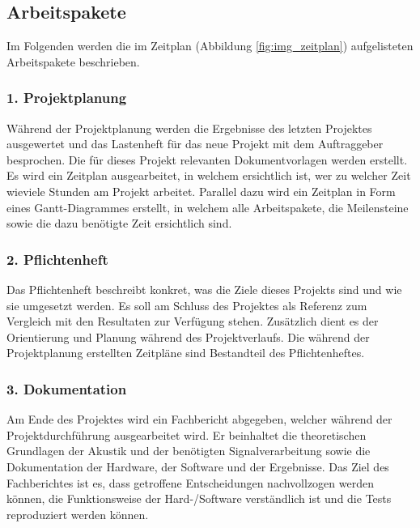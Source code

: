 \documentclass[10pt,a4paper,oneside]{99_fhnwreport}
\begin{document}
\subsection*{Arbeitspakete}\label{sec:arbeitspakete}
Im Folgenden werden die im Zeitplan (Abbildung \ref{fig:img_zeitplan}) aufgelisteten Arbeitspakete beschrieben.


\subsubsection*{1. Projektplanung}
Während der Projektplanung werden die Ergebnisse des letzten Projektes ausgewertet und das Lastenheft für das neue Projekt mit dem Auftraggeber besprochen. Die für dieses Projekt relevanten Dokumentvorlagen werden erstellt. Es wird ein Zeitplan ausgearbeitet, in welchem ersichtlich ist, wer zu welcher Zeit wieviele Stunden am Projekt arbeitet. Parallel dazu wird ein Zeitplan in Form eines Gantt-Diagrammes erstellt, in welchem alle Arbeitspakete, die Meilensteine sowie die dazu benötigte Zeit ersichtlich sind.


\subsubsection*{2. Pflichtenheft}
Das Pflichtenheft beschreibt konkret, was die Ziele dieses Projekts sind und wie sie umgesetzt werden. Es soll am Schluss des Projektes als Referenz zum Vergleich mit den Resultaten zur Verfügung stehen. Zusätzlich dient es der Orientierung und Planung während des Projektverlaufs. Die während der Projektplanung erstellten Zeitpläne sind Bestandteil des Pflichtenheftes.


\subsubsection*{3. Dokumentation}
Am Ende des Projektes wird ein Fachbericht abgegeben, welcher während der Projektdurchführung ausgearbeitet wird. Er beinhaltet die theoretischen Grundlagen der Akustik und der benötigten Signalverarbeitung sowie die Dokumentation der Hardware, der Software und der Ergebnisse. Das Ziel des Fachberichtes ist es, dass getroffene Entscheidungen nachvollzogen werden können, die Funktionsweise der Hard-/Software verständlich ist und die Tests reproduziert werden können.
\end{document}
